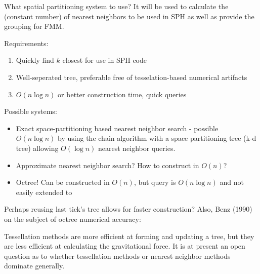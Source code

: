 \documentclass[../main.tex]{subfiles}
\begin{document}
What spatial partitioning system to use? It will be used to calculate the (constant number) of nearest neighbors to be used in SPH as well as provide the grouping for FMM.

Requirements:
\begin{enumerate}
    \item Quickly find $k$ closest for use in SPH code
    \item Well-seperated tree, preferable free of tesselation-based numerical artifacts
    \item $O(n \log n)$ or better construction time, quick queries
\end{enumerate}

Possible systems:
\begin{itemize}
    \item Exact space-partitioning based nearest neighbor search - possible $O(n\log n)$ by using the chain algorithm with a space partitioning tree (k-d tree) allowing $O(\log n)$ nearest neighbor queries.
    \item Approximate nearest neighbor search? How to construct in $O(n)$?
    \item Octree! Can be constructed in $O(n)$, but query is $O(n\log n)$ and not easily extended to 
\end{itemize}

Perhaps reusing last tick's tree allows for faster construction? Also, Benz (1990) on the subject of octree numerical accuracy:

\begin{displayquote}
Tessellation methods are more efficient at forming and updating a tree, but they are less efficient at calculating the gravitational force. It is at present an open question as to whether tessellation methods or nearest neighbor methods dominate generally.
\end{displayquote}
\end{document}
